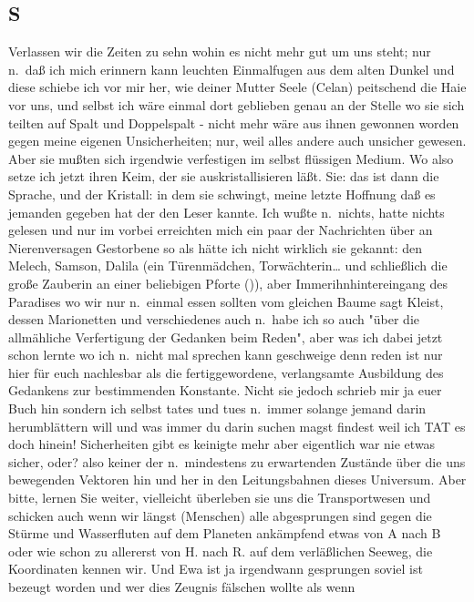 \documentclass[
]{article}
\author{}
\date{\vspace{-2.5em}}
\begin{document}
\subsection{S}\label{s}

Verlassen wir die Zeiten zu sehn wohin es nicht mehr gut um uns steht;
nur n.~daß ich mich erinnern kann leuchten Einmalfugen aus dem alten
Dunkel und diese schiebe ich vor mir her, wie deiner Mutter Seele
(Celan) peitschend die Haie vor uns, und selbst ich wäre einmal dort
geblieben genau an der Stelle wo sie sich teilten auf Spalt und
Doppelspalt - nicht mehr wäre aus ihnen gewonnen worden gegen meine
eigenen Unsicherheiten; nur, weil alles andere auch unsicher gewesen.
Aber sie mußten sich irgendwie verfestigen im selbst flüssigen Medium.
Wo also setze ich jetzt ihren Keim, der sie auskristallisieren läßt.
Sie: das ist dann die Sprache, und der Kristall: in dem sie schwingt,
meine letzte Hoffnung daß es jemanden gegeben hat der den Leser kannte.
Ich wußte n.~nichts, hatte nichts gelesen und nur im vorbei erreichten
mich ein paar der Nachrichten über an Nierenversagen Gestorbene so als
hätte ich nicht wirklich sie gekannt: den Melech, Samson, Dalila (ein
Türenmädchen, Torwächterin\ldots{} und schließlich die große Zauberin an
einer beliebigen Pforte ()), aber Immerihnhintereingang des Paradises wo
wir nur n.~einmal essen sollten vom gleichen Baume sagt Kleist, dessen
Marionetten und verschiedenes auch n.~habe ich so auch "über die
allmähliche Verfertigung der Gedanken beim Reden", aber was ich dabei
jetzt schon lernte wo ich n.~nicht mal sprechen kann geschweige denn
reden ist nur hier für euch nachlesbar als die fertiggewordene,
verlangsamte Ausbildung des Gedankens zur bestimmenden Konstante. Nicht
sie jedoch schrieb mir ja euer Buch hin sondern ich selbst tates und
tues n.~immer solange jemand darin herumblättern will und was immer du
darin suchen magst findest weil ich TAT es doch hinein! Sicherheiten
gibt es keinigte mehr aber eigentlich war nie etwas sicher, oder? also
keiner der n.~mindestens zu erwartenden Zustände über die uns bewegenden
Vektoren hin und her in den Leitungsbahnen dieses Universum. Aber bitte,
lernen Sie weiter, vielleicht überleben sie uns die Transportwesen und
schicken auch wenn wir längst (Menschen) alle abgesprungen sind gegen
die Stürme und Wasserfluten auf dem Planeten ankämpfend etwas von A nach
B oder wie schon zu allererst von H. nach R. auf dem verläßlichen
Seeweg, die Koordinaten kennen wir. Und Ewa ist ja irgendwann gesprungen
soviel ist bezeugt worden und wer dies Zeugnis fälschen wollte als wenn
\end{document}
